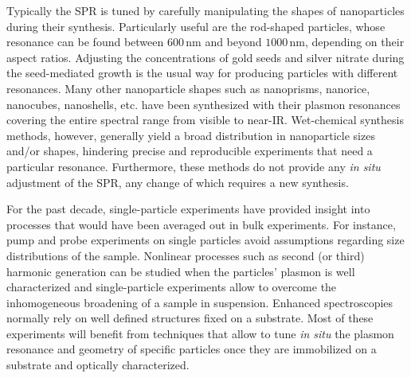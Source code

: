 \documentclass[twoside,twocolumn,11pt]{article}
\newcommand{\nm}{\ensuremath{\,\textrm{nm}}}
\begin{document}
Typically the SPR is tuned by carefully manipulating the shapes of nanoparticles
during their synthesis. Particularly useful are the rod-shaped particles, whose
resonance can be found between $600\nm$ and beyond $1000\nm$, depending on
their aspect ratios. Adjusting the concentrations of gold seeds and silver
nitrate during the seed-mediated growth\cite{Vigderman2012} is
the usual way for producing particles with different resonances. Many other
nanoparticle shapes such as nanoprisms, nanorice, nanocubes, nanoshells, etc.
have been synthesized with their plasmon resonances covering the entire spectral
range from visible to near-IR\cite{Lal2007}. Wet-chemical synthesis methods,
however, generally yield a broad distribution in nanoparticle sizes and/or
shapes, hindering precise and reproducible experiments that need a particular
resonance. Furthermore, these methods do not provide any \textit{in situ}
adjustment of the SPR, any change of which requires a new synthesis.

For the past decade, single-particle experiments have provided insight into
processes that would have been averaged out in bulk experiments.
For instance, pump and probe experiments on single particles avoid assumptions
regarding size distributions of the
sample\cite{Hartland2006}\cite{Ruijgrok2012c}. Nonlinear processes such as
second (or third) harmonic generation can be studied when the particles' plasmon is
well characterized and single-particle experiments allow to overcome the
inhomogeneous broadening of a sample in
suspension\cite{Butet2010}\cite{Lippitz2005}. Enhanced spectroscopies normally
rely on well defined structures fixed on a substrate\cite{Olk2008}.
Most of these experiments will benefit from techniques that allow to tune \textit{in
situ} the plasmon resonance and geometry of specific particles once they
are immobilized on a substrate and optically characterized.
\end{document}
